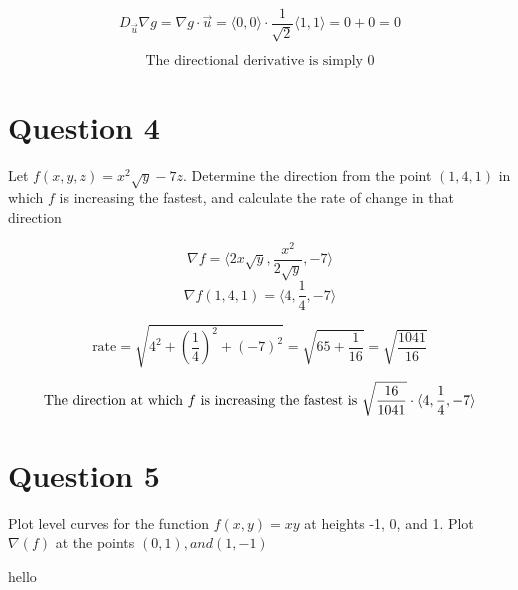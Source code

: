\documentclass[hidelinks]{article}
\begin{document}
 \[ D_{\vec{u}}\nabla g = \nabla g \cdot \vec{u} = 
	 \langle 0, 0 \rangle \cdot \frac{1}{\sqrt{2}}\langle 1, 1 \rangle = 0 + 0 = 0 \]

\[
	\text{The directional derivative is simply 0}
\]
\newpage
\section{Question 4}
Let $f(x, y, z) = x^2\sqrt{y}-7z$. Determine the direction from the point $(1, 4, 1)$ in which $f$ is increasing the fastest, and calculate the rate of change in that direction

\[
	\nabla f = \langle 2x\sqrt{y}, \frac{x^2}{2\sqrt{y}}, -7 \rangle
\]
\[
	\nabla f(1, 4, 1) = \langle 4, \frac{1}{4}, -7 \rangle
\]

\[
	\text{rate} = \sqrt{4^2+(\frac{1}{4})^2+(-7)^2} = \sqrt{65 + \frac{1}{16}} = \sqrt{\frac{1041}{16}}
\]

\[
	\text{The direction at which $f$ is increasing the fastest is $ \sqrt{\frac{16}{1041}} \cdot \langle 4, \frac{1}{4}, -7 \rangle
$}
\]
\newpage

\section{Question 5}
Plot level curves for the function $f(x, y) = xy$ at heights -1, 0, and 1. Plot $\nabla(f)$ at the points $(0, 1), and (1, -1)$

hello
\end{document}
